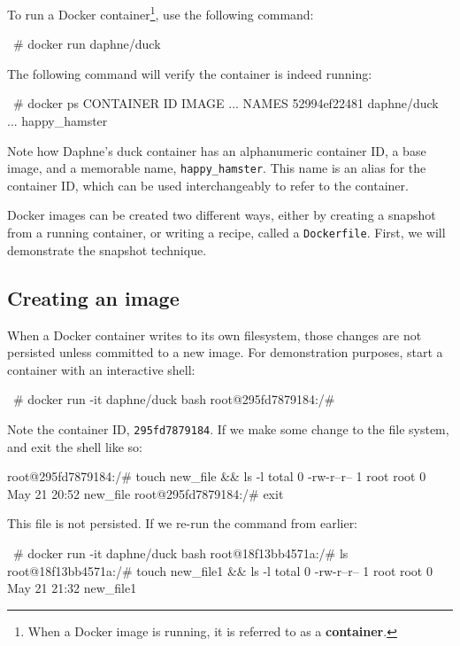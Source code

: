 \documentclass[12pt,initial,twoside,maitrise]{dms}
\def\inline{\lstinline[basicstyle=\ttfamily]}
\numberwithin{equation}{section}
\numberwithin{table}{chapter}
\numberwithin{figure}{chapter}
\begin{document}
To run a Docker container\footnote{When a Docker image is running, it is referred to as a \textbf{container}.}, use the following command:

\begin{pclisting}
~# docker run daphne/duck
\end{pclisting}

The following command will verify the container is indeed running:

\begin{pclisting}
~# docker ps
CONTAINER ID     IMAGE           ...     NAMES
52994ef22481     daphne/duck     ...     happy_hamster
\end{pclisting}

Note how Daphne’s duck container has an alphanumeric container ID, a base image, and a memorable name, \inline{happy_hamster}. This name is an alias for the container ID, which can be used interchangeably to refer to the container.

Docker images can be created two different ways, either by creating a snapshot from a running container, or writing a recipe, called a \inline{Dockerfile}. First, we will demonstrate the snapshot technique.

\subsection{Creating an image}\label{subsec:creating-an-image}

When a Docker container writes to its own filesystem, those changes are not persisted unless committed to a new image. For demonstration purposes, start a container with an interactive shell:

\begin{pclisting}
~# docker run -it daphne/duck bash
root@295fd7879184:/#
\end{pclisting}

Note the container ID, \inline{295fd7879184}. If we make some change to the file system, and exit the shell like so:

\begin{pclisting}
root@295fd7879184:/# touch new_file && ls -l
total 0
-rw-r--r-- 1 root root 0 May 21 20:52 new_file
root@295fd7879184:/# exit
\end{pclisting}

This file is not persisted. If we re-run the command from earlier:

\begin{pclisting}
~# docker run -it daphne/duck bash
root@18f13bb4571a:/# ls
root@18f13bb4571a:/# touch new_file1 && ls -l
total 0
-rw-r--r-- 1 root root 0 May 21 21:32 new_file1
\end{pclisting}
\end{document}

